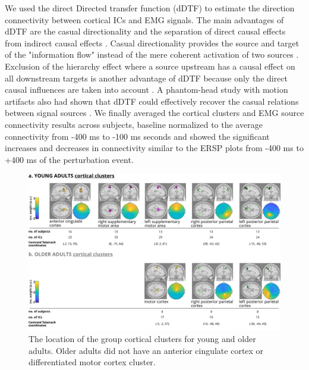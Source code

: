 \documentclass[../thesis_seyed.tex]{subfiles}
\begin{document}
We used the direct Directed transfer function (dDTF) to estimate the direction connectivity between cortical ICs and EMG signals. The main advantages of dDTF are the casual directionality and the separation of direct causal effects from indirect causal effects \cite{Korzeniewska2003-ol,Peterson2019-wz,Cohen2014-vt,Kaminski2001-oi}. Casual directionality provides the source and target of the "information flow" instead of the mere coherent activation of two sources \cite{Kaminski2001-oi}. Exclusion of the hierarchy effect where a source upstream has a causal effect on all downstream targets is another advantage of dDTF because only the direct causal influences are taken into account \cite{Korzeniewska2003-ol}. A phantom-head study with motion artifacts also had shown that dDTF could effectively recover the casual relations between signal sources \cite{Peterson2018-la}. We finally averaged the cortical clusters and EMG source connectivity results across subjects, baseline normalized to the average connectivity from -400 ms to -100 ms seconds and showed the significant increases and decreases in connectivity similar to the ERSP plots from -400 ms to +400 ms of the perturbation event.

\begin{figure}[tb]
    \centering
    \includegraphics[width=\linewidth]{../img/figure 2 - individual cluster.jpg}
    \caption{The location of the group cortical clusters for young and older adults. Older adults did not have an anterior cingulate cortex or differentiated motor cortex cluster.}
    \label{fig:yo_dipoles}
\end{figure}
\end{document}
